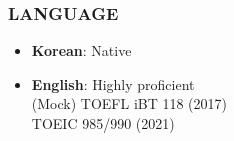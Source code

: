 \documentclass[10pt,a4]{article}
\begin{document}
\begin{small}
\subsubsection*{LANGUAGE}

\begin{itemize}{}{}
	\item \textbf{Korean}: Native
	\item \textbf{English}: Highly proficient  \\ %
	(Mock) TOEFL iBT 118 (2017) \\
	TOEIC 985/990 (2021)
	
\end{itemize}

\vspace{0.1cm}

%
%
%
%
%
%
%
%
%



\end{small}
\end{document}
